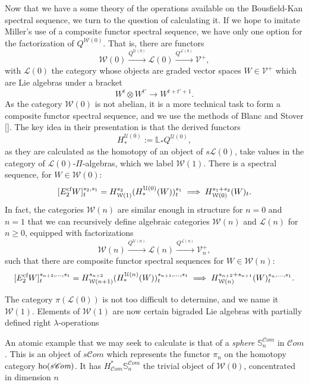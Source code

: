 \documentclass[11pt]{amsart} \renewcommand{\baselinestretch}{1.2}
\theoremstyle{plain}
\theoremstyle{definition}
\renewcommand{\to}{\longrightarrow}
\newcommand{\scrC}{\mathscr{C}}
\newcommand{\calV}{\mathcal{V}}
\newcommand{\calw}{\mathcal{W}}
\newcommand{\calu}{\mathcal{U}}
\newcommand{\call}{\mathcal{L}}
\newcommand{\vect}[2]{\calV^{#1}_{#2}}
\newcommand{\PA}[1]{\pi#1}
\newcommand{\algs}{{\scrC\!\textit{om}}}
\newcommand{\E}[5]{[E^{#1}_{#2}#3]^{#4}_{#5}}
\begin{document}
\begin{Introduction}
Now that we have a some theory of the operations available on the Bousfield-Kan spectral sequence, we turn to the question of calculating it. If we hope to imitate Miller's use of a composite functor spectral sequence, we have only one option for the factorization of $Q^{\calw(0)}$. That is, there are functors
\[\calw(0)\overset{Q^{\calu(0)}}{\to}\call(0)\overset{Q^{\call(0)}}{\to}\vect{+}{},\]
with $\call(0)$ the category whose objects are graded vector spaces $W\in\vect{+}{}$ which are Lie algebras under a bracket
\[W^{t}\otimes W^{t'}\to W^{t+t'+1}.\]
As the category $\calw(0)$ is not abelian, it is a more technical task to form a composite functor spectral sequence, and we use the methods of Blanc and Stover []. The key idea in their presentation is that the derived functors
\[H_*^{\calu(0)}:=\mathbb{L}_*Q^{\calu(0)},\]
as they are calculated as the homotopy of an object of $s\call(0)$, take values in the category  of $\call(0)$-$\Pi$-algebras, which we label $\calw(1)$. There is a spectral sequence, for $W\in\calw(0)$:
\[\E{\textup{cf}}{2}{W}{s_2,s_1}{t}=H^{s_2}_{\calw(1)}(H_*^{\calu(0)}(W))^{s_1}_t\implies H^{s_1+s_2}_{\calw(0)} (W)_t.\]
In fact, the categories $\calw(n)$ are similar enough in structure for $n=0$ and $n=1$ that we can recursively define algebraic categories $\calw(n)$ and $\call(n)$ for $n\geq0$, equipped with factorizations 
\[\calw(n)\overset{Q^{\calu(n)}}{\to}\call(n)\overset{Q^{\call(n)}}{\to}\vect{+}{n},\]
such that there are composite functor spectral sequences for $W\in\calw(n)$:
\[\E{\textup{cf}}{2}{W}{s_{n+2},\ldots,s_1}{t}=H^{s_{n+2}}_{\calw(n+1)}(H_*^{\calu(n)}(W))^{s_{n+1},\ldots,s_1}_t\implies H^{s_{n+2}+s_{n+1}}_{\calw(n)} (W)_t^{s_n,\ldots,s_1}.\]




The category $\PA{(\call(0))}$ is not too difficult to determine, and we name it $\calw(1)$. Elements of $\calw(1)$ are now certain bigraded Lie algebras with partially defined right $\lambda$-operations





An atomic example that we may seek to calculate is that of a \emph{sphere} $\mathbb{S}_n^{\algs} $ in $\algs$. This is an object of $s\algs$ which represents the functor $\pi_n$ on the homotopy category $\textup{ho}(s\algs)$. It has $H^*_{\algs}\mathbb{S}_n^{\algs}$ the trivial object of $\calw(0)$, concentrated in dimension $n$




\end{Introduction}
\end{document}
